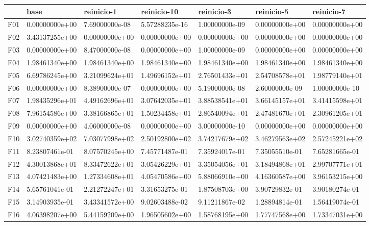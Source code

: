 \begin{tabular}{lllllll}
\toprule
{} &            base &      reinicio-1 &     reinicio-10 &      reinicio-3 &      reinicio-5 &      reinicio-7 \\
\midrule
F01  &  0.00000000e+00 &  7.69000000e-08 &  5.57288235e-16 &  1.00000000e-09 &  0.00000000e+00 &  0.00000000e+00 \\
F02  &  3.43137255e+00 &  0.00000000e+00 &  0.00000000e+00 &  0.00000000e+00 &  0.00000000e+00 &  0.00000000e+00 \\
F03  &  0.00000000e+00 &  8.47000000e-08 &  0.00000000e+00 &  1.00000000e-09 &  0.00000000e+00 &  0.00000000e+00 \\
F04  &  1.98461340e+00 &  1.98461340e+00 &  1.98461340e+00 &  1.98461340e+00 &  1.98461340e+00 &  1.98461340e+00 \\
F05  &  6.69786245e+00 &  3.21099624e+01 &  1.49696152e+01 &  2.76501433e+01 &  2.54708578e+01 &  1.98779140e+01 \\
F06  &  0.00000000e+00 &  8.38900000e-07 &  0.00000000e+00 &  5.19000000e-08 &  2.60000000e-09 &  1.00000000e-10 \\
F07  &  1.98435296e+01 &  4.49162696e+01 &  3.07642035e+01 &  3.88538541e+01 &  3.66145157e+01 &  3.41415598e+01 \\
F08  &  7.96154586e+00 &  3.38166865e+01 &  1.50234458e+01 &  2.86540094e+01 &  2.47481670e+01 &  2.30961205e+01 \\
F09  &  0.00000000e+00 &  4.06000000e-08 &  0.00000000e+00 &  3.00000000e-10 &  0.00000000e+00 &  0.00000000e+00 \\
F10  &  3.02740359e+02 &  7.03077998e+02 &  2.50192800e+02 &  3.74217679e+02 &  3.46279563e+02 &  2.57245221e+02 \\
F11  &  8.23807461e-01 &  8.07570245e+00 &  7.45771487e-01 &  7.35924017e-01 &  7.35055510e-01 &  7.65281665e-01 \\
F12  &  4.30013868e+01 &  8.33472622e+01 &  3.05426229e+01 &  3.35054056e+01 &  3.18494868e+01 &  2.99707771e+01 \\
F13  &  4.07421483e+00 &  1.27334608e+01 &  4.05470586e+00 &  5.88066910e+00 &  4.16360587e+00 &  3.96153215e+00 \\
F14  &  5.65761041e-01 &  2.21272247e+01 &  3.31653275e-01 &  1.87508703e+00 &  3.90729832e-01 &  3.90180274e-01 \\
F15  &  3.14903935e-01 &  3.43341572e+00 &  9.02603488e-02 &  9.11211867e-02 &  1.28894814e-01 &  1.56419074e-01 \\
F16  &  4.06398207e+00 &  5.44159209e+00 &  1.96505602e+00 &  1.58768195e+00 &  1.77747568e+00 &  1.73347031e+00 \\

\end{tabular}
